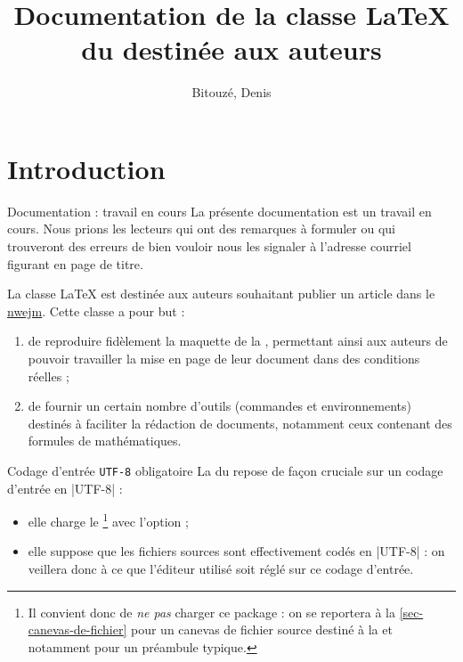 \documentclass[french,nolocaltoc]{nwejmart}
\newtheorem[title=Fait,style=definition]{fact}
\begin{document}
\title[Documentation de la classe \LaTeX{} du \texorpdfstring{\nwejm}{NWEJM}]{Documentation de la classe \LaTeX{} du \nwejm*{} destinée aux auteurs}
%
\author[%
affiliation={%
  Université du Littoral Côte d'Opale, Laboratoire de mathématiques pures et
  appliquées (\nolinkurl{denis.bitouze@lmpa.univ-littoral.fr})%
},%
]{Bitouzé, Denis}
%
\maketitle
%
\etocarticlestylenomarks
\localtableofcontents
%

\section{Introduction}
\label{sec-introduction}

\begin{dbremark}{Documentation : travail en cours}{}
  La présente documentation est un travail en cours. Nous prions les lecteurs
  qui ont des remarques à formuler ou qui trouveront des erreurs de bien vouloir
  nous les signaler à l'adresse courriel figurant en page de titre.
\end{dbremark}

La classe \LaTeX{} \nwejmauthor{} est destinée aux auteurs souhaitant publier un
article dans le \href{http://math.univ-lille1.fr/~nwejm/}{\gls{nwejm}}. Cette
classe a pour but :
\begin{enumerate}
\item de reproduire fidèlement la maquette de la \nwejm{}, permettant ainsi
  aux auteurs de pouvoir travailler la mise en page de leur document dans des
  conditions réelles ;
\item de fournir un certain nombre d'outils (commandes et environnements)
  destinés à faciliter la rédaction de documents, notamment ceux contenant des
  formules de mathématiques.
\end{enumerate}

\begin{dbwarning}{Codage d'entrée \protect\lstinline+UTF-8+ obligatoire}{}
  La \nwejmauthorcl{} du \nwejm{} repose de façon cruciale sur un codage
  d'entrée en |UTF-8| :
  \begin{itemize}
  \item elle charge le \footnote{%
      Il convient donc de \emph{ne pas} charger ce package : on se reportera
      à la \vref{sec-canevas-de-fichier} pour un canevas de fichier source
      destiné à la \nwejm{} et notamment pour un préambule typique.%
    }
    avec l'option  ;
  \item elle suppose que les fichiers sources  sont effectivement
    codés en |UTF-8| : on veillera donc à ce que l'éditeur utilisé soit réglé
    sur ce codage d'entrée.
  \end{itemize}
\end{dbwarning}
\end{document}
